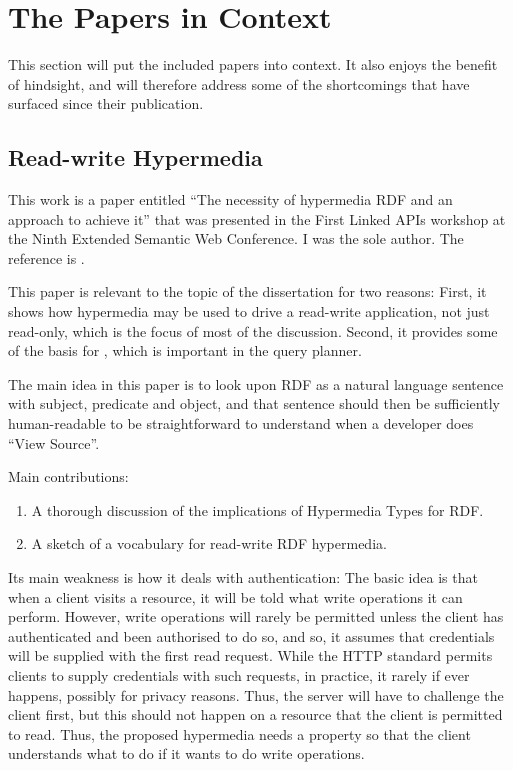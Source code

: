 \section{The Papers in Context}\label{sec:papersincontext}

This section will put the included papers into context. It also enjoys
the benefit of hindsight, and will therefore address some of the
shortcomings that have surfaced since their publication.

\subsection{Read-write Hypermedia}\label{sec:conlapis}

This work is a paper entitled ``The necessity of hypermedia RDF and an
approach to achieve it'' that was presented in the First Linked APIs
workshop at the Ninth Extended Semantic Web Conference. I was the sole
author. The reference is \cite{kjernsmo_lapis_2012}.

This paper is relevant to the topic of the dissertation for two
reasons: First, it shows how hypermedia may be used to drive a
read-write application, not just read-only, which is the focus of most
of the discussion. Second, it provides some of the basis for
\cite{ldf1}, which is important in the query planner.

The main idea in this paper is to look upon RDF as a natural language
sentence with subject, predicate and object, and that sentence should
then be sufficiently human-readable to be straightforward to
understand when a developer does ``View Source''.

Main contributions:
\begin{enumerate}
\item A thorough discussion of the implications of Hypermedia
  Types\cite{hypermediatypes} for RDF.
\item A sketch of a vocabulary for read-write RDF hypermedia.
\end{enumerate}

Its main weakness is how it deals with authentication: The basic idea
is that when a client visits a resource, it will be told what
write operations it can perform. However, write operations will rarely
be permitted unless the client has authenticated and been authorised
to do so, and so, it assumes that credentials will be supplied with
the first read request. While the HTTP standard permits clients to
supply credentials with such requests, in practice, it rarely if ever
happens, possibly for privacy reasons. Thus, the server will have to
challenge the client first, but this should not happen on a resource
that the client is permitted to read. Thus, the proposed hypermedia
needs a property so that the client understands what to do if it wants
to do write operations.

